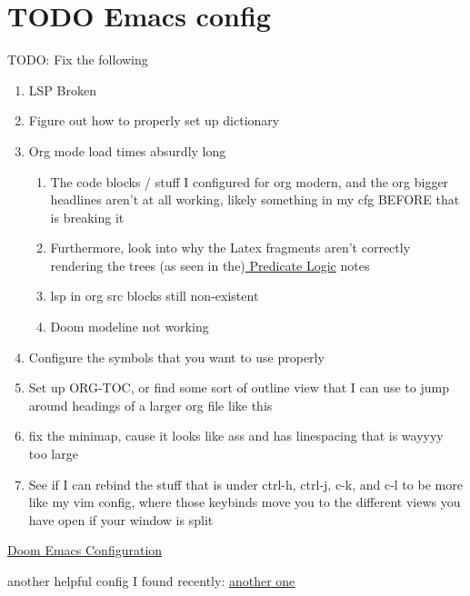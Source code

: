 \documentclass{article}
\author{Liam Wirth}
\date{\today}
\title{}
\begin{document}
\tableofcontents\newpage
\section{{\bfseries\sffamily TODO} Emacs config}
\label{sec:orga6e7356}
TODO: Fix the following
\begin{enumerate}
\item LSP Broken
\item Figure out how to properly set up dictionary
\item Org mode load times absurdly long
\begin{enumerate}
\item The code blocks / stuff I configured for org modern, and the org bigger headlines aren't at all working, likely something in my cfg BEFORE that is breaking it
\item Furthermore, look into why the Latex fragments aren't correctly rendering the trees (as seen in the)\href{roam/20240324021855-predicate\_logic\_as\_a\_formal\_language.org}{ Predicate Logic} notes
\item lsp in org src blocks still non-existent
\item Doom modeline not working
\end{enumerate}
\item Configure the symbols that you want to use properly
\item Set up ORG-TOC, or find some sort of outline view that I can use to jump around headings of a larger org file like this
\item fix the minimap, cause it looks like ass and has linespacing that is wayyyy too large
\item See if I can rebind the stuff that is under ctrl-h, ctrl-j, c-k, and c-l to be more like my vim config, where those keybinds move you to the different views you have open if your window is split
\end{enumerate}




\href{https://tecosaur.github.io/emacs-config/config.html}{Doom Emacs Configuration}

another helpful config I found recently:
\href{https://hieuphay.com/doom-emacs-config/}{another one}
\end{document}

